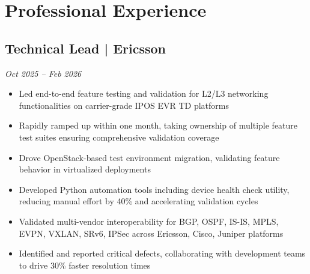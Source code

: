 \documentclass[10pt,a4paper]{article}
\begin{document}
\vspace{-4pt}

\section*{Professional Experience}

\subsection*{Technical Lead | Ericsson}
\hfill \textit{Oct 2025 -- Feb 2026}
\begin{itemize}
    \item Led end-to-end feature testing and validation for L2/L3 networking functionalities on carrier-grade IPOS EVR TD platforms
    \item Rapidly ramped up within one month, taking ownership of multiple feature test suites ensuring comprehensive validation coverage
    \item Drove OpenStack-based test environment migration, validating feature behavior in virtualized deployments
    \item Developed Python automation tools including device health check utility, reducing manual effort by 40\% and accelerating validation cycles
    \item Validated multi-vendor interoperability for BGP, OSPF, IS-IS, MPLS, EVPN, VXLAN, SRv6, IPSec across Ericsson, Cisco, Juniper platforms
    \item Identified and reported critical defects, collaborating with development teams to drive 30\% faster resolution times
\end{itemize}
\end{document}
